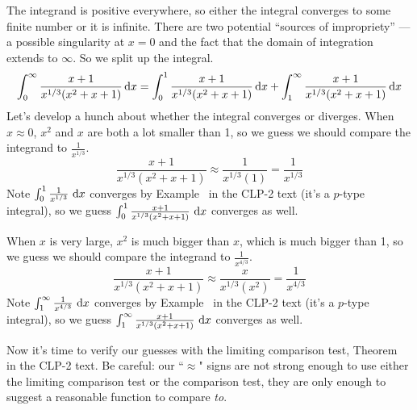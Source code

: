 \begin{solution}
The integrand is positive everywhere, so either the integral
converges to some finite number or it is infinite. There are two potential
``sources of impropriety'' --- a possible singularity at $x=0$ and
the fact that the domain of integration extends to $\infty$.
So we split up the integral.
\begin{align*}
\int_0^\infty\frac{x+1}{x^{1/3}(x^2+x+1)}\,\mathrm{d}x
= \int_0^1\frac{x+1}{x^{1/3}(x^2+x+1)}\,\mathrm{d}x
  +\int_1^\infty\frac{x+1}{x^{1/3}(x^2+x+1)}\,\mathrm{d}x
\end{align*}
Let's develop a hunch about whether the integral converges or diverges. When $x\approx 0$,  $x^2$ and $x$ are both a lot smaller than 1, so we guess we should compare the integrand to $\frac{1}{x^{1/3}}$.
\begin{equation*}
\frac{x+1}{x^{1/3}(x^2+x+1)} \approx \frac{1}{x^{1/3}(1)} =
                                      \frac{1}{x^{1/3}}
\end{equation*}
Note $\int_0^1 \frac{1}{x^{1/3}}~\mathrm{d}x$ converges by Example~
 in the CLP-2 text (it's a $p$-type integral), so we guess $\int_0^1 \frac{x+1}{x^{1/3}(x^2+x+1)}~\mathrm{d}x$ converges as well.

When $x$ is very large, $x^2$ is much bigger than $x$, which is much bigger than 1, so we guess we should compare the integrand to $\frac{1}{x^{4/3}}$.
\begin{equation*}
\frac{x+1}{x^{1/3}(x^2+x+1)} \approx \frac{x}{x^{1/3}(x^2)} =
                                      \frac{1}{x^{4/3}}
\end{equation*}
Note $\int_1^\infty \frac{1}{x^{4/3}}~\mathrm{d}x$ converges by Example~ in the CLP-2 text (it's a $p$-type integral), so we guess $\int_1^\infty \frac{x+1}{x^{1/3}(x^2+x+1)}~\mathrm{d}x$ converges as well.

Now it's time to verify our guesses with the limiting comparison test, Theorem~ in the CLP-2 text. Be careful:
our ``$\approx$" signs are not strong enough to use either the limiting comparison test or the comparison test, they are only enough to suggest a reasonable function to compare \emph{to}.


\end{solution}

